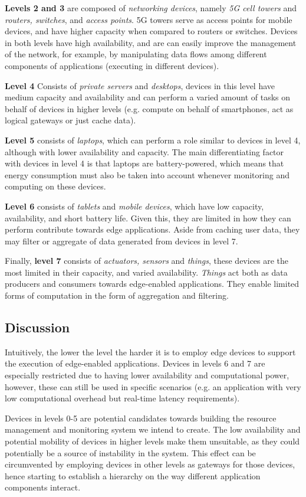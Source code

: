 \textbf{Levels 2 and 3} are composed of \textit{networking devices}, namely 
\textit{5G cell towers} and \textit{routers, switches}, and \textit{access points}. 5G towers serve as access points for mobile devices, and have higher capacity when compared to routers or switches. Devices in both levels have high availability, and are can easily improve the management of the network, for example, by manipulating data flows among different components of applications (executing in different devices).

\textbf{Level 4} Consists of \textit{private servers} and \textit{desktops}, devices in this level have medium capacity and availability and can perform a varied amount of tasks on behalf of devices in higher levels (e.g. compute on behalf of smartphones, act as logical gateways or just cache data). 

\textbf{Level 5} consists of \textit{laptops}, which can perform a role similar to devices in level 4, although with lower availability and capacity. The main differentiating factor with devices in level 4 is that laptops are battery-powered, which means that energy consumption must also be taken into account whenever monitoring and computing on these devices. 

\textbf{Level 6} consists of \textit{tablets} and \textit{mobile devices}, which have low capacity, availability, and short battery life. Given this, they are limited in how they can perform contribute towards edge applications. Aside from caching user data, they may filter or aggregate of data generated from devices in level 7. 

Finally, \textbf{level 7} consists of \textit{actuators, sensors} and \textit{things}, these devices are the most limited in their capacity, and varied availability. \textit{Things} act both as data producers and consumers towards edge-enabled applications. They enable limited forms of computation in the form of aggregation and filtering.

\subsection{Discussion}

Intuitively, the lower the level the harder it is to employ edge devices to support the execution of edge-enabled applications. Devices in levels 6 and 7 are especially restricted due to having lower availability and computational power, however, these can still be used in specific scenarios (e.g. an application with very low computational overhead but real-time latency requirements). 

Devices in levels 0-5 are potential candidates towards building the resource management and monitoring system we intend to create. The low availability and potential mobility of devices in higher levels make them unsuitable, as they could potentially be a source of instability in the system. This effect can be circumvented by employing devices in other levels as gateways for those devices, hence starting to establish a hierarchy on the way different application components interact.